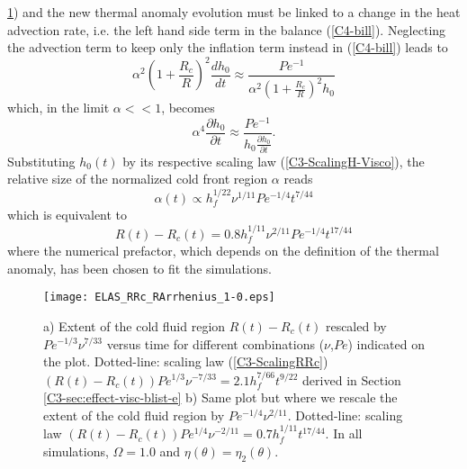\ref{C4-ELAS_RRc_RArrhenius_1-0})   and   the  new   thermal   anomaly
evolution must be linked to a  change in the heat advection rate, i.e.
the left  hand side term  in the balance  (\ref{C4-bill}).  Neglecting
the  advection  term  to  keep  only the  inflation  term  instead  in
(\ref{C4-bill}) leads to
\begin{equation}
  \alpha^2\left(1+\frac{R_c}{R}\right)^2\frac{d h_0}{d
    t}\approx \frac{Pe^{-1}}{\alpha^2\left(1+\frac{R_c}{R}\right)^2h_0}
\end{equation}
which, in the limit $\alpha<<1$, becomes
\begin{equation}
  \alpha^4\frac{\partial h_0}{\partial
    t} \approx \frac{Pe^{-1}}{h_0\frac{\partial h_0}{\partial t}}.
\end{equation}
Substituting    $h_0(t)$    by     its    respective    scaling    law
(\ref{C3-ScalingH-Visco}), the  relative size  of the  normalized cold
front region $\alpha$ reads
\begin{equation}
  \alpha(t) \propto h_f^{1/22}\nu^{1/11}Pe^{-1/4}t^{7/44}
\end{equation}
which is equivalent to
\begin{equation}
  R(t)-R_c(t) = 0.8h_f^{1/11}\nu^{2/11}Pe^{-1/4}t^{17/44}
  \label{C4-ScalingRRc-Heating}
\end{equation}
where the numerical prefactor, which  depends on the definition of the
thermal anomaly, has been chosen to fit the simulations.

\begin{figure}[h!]
  \begin{center}
    \graphicspath{ {/Users/thorey/Documents/These/Projet/Refroidissement/Skin_Model/Figure/Figure_Heating/} }
    \texttt{[image: ELAS\_RRc\_RArrhenius\_1-0.eps]}
    \caption{a) Extent of the cold fluid region $R(t)-R_c(t)$ rescaled
      by $Pe^{-1/3}\nu^{7/33}$ versus  time for different combinations
      ($\nu$,$Pe$) indicated  on the  plot.  Dotted-line:  scaling law
      (\ref{C3-ScalingRRc})
      $(R(t)-R_c(t))Pe^{1/3}\nu^{-7/33}=    2.1    h_f^{7/66}t^{9/22}$
      derived in Section \ref{C3-sec:effect-visc-blist-e} b) Same plot
      but where  we rescale  the extent  of the  cold fluid  region by
      $Pe^{-1/4}\nu^{2/11}$.       Dotted-line:       scaling      law
      $(R(t)-R_c(t))Pe^{1/4}\nu^{-2/11}= 0.7  h_f^{1/11}t^{17/44}$. In
      all           simulations,            $\Omega=1.0$           and
      $\eta(\theta)=\eta_2(\theta)$.}
    \label{C4-ELAS_RRc_RArrhenius_1-0}
  \end{center}
\end{figure}

